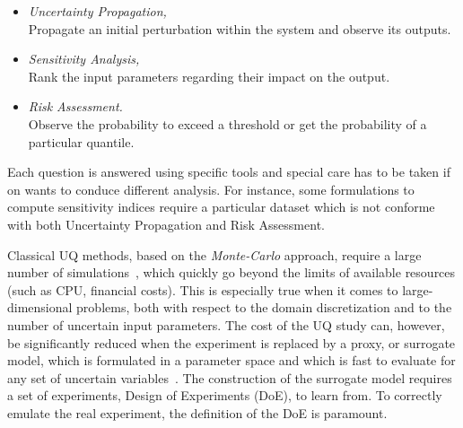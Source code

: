 \begin{itemize}
	\item \emph{Uncertainty Propagation,}\hfill\\
Propagate an initial perturbation within the system and observe its outputs.
	\item \emph{Sensitivity Analysis,}\hfill\\
Rank the input parameters regarding their impact on the output.
	\item \emph{Risk Assessment.}\hfill\\
Observe the probability to exceed a threshold or get the probability of a particular quantile.
\end{itemize}

Each question is answered using specific tools and special care has to be taken if on wants to conduce different analysis. For instance, some formulations to compute sensitivity indices require a particular dataset which is not conforme with both Uncertainty Propagation and Risk Assessment.

Classical UQ methods, based on the \emph{Monte-Carlo} approach, require a large number of simulations~\cite{Saltelli2007}, which quickly go beyond the limits of available resources (such as CPU, financial costs). This is especially true when it comes to large-dimensional problems, both with respect to the domain discretization and to the number of uncertain input parameters. The cost of the UQ study can, however, be significantly reduced when the experiment is replaced by a proxy, or surrogate model, which is formulated in a parameter space and which is fast to evaluate for any set of uncertain variables~\cite{martin2005}. The construction of the surrogate model requires a set of experiments, Design of Experiments (DoE), to learn from. To correctly emulate the real experiment, the definition of the DoE is paramount.\bigskip

%
%
%

